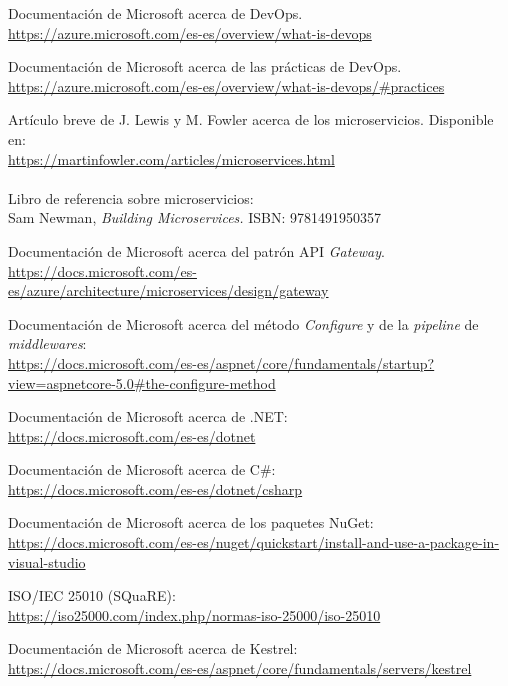 \documentclass[11pt,spanish,listoffigures]{tfgetsinf}
\begin{document}
\begin{thebibliography}{10}

Documentación de Microsoft acerca de DevOps.\\
\url{https://azure.microsoft.com/es-es/overview/what-is-devops}

Documentación de Microsoft acerca de las prácticas de DevOps.\\
\url{https://azure.microsoft.com/es-es/overview/what-is-devops/#practices}

Artículo breve de J. Lewis y M. Fowler acerca de los microservicios.
\newblock Disponible en:\\
\url{https://martinfowler.com/articles/microservices.html}\\\\
\newblock Libro de referencia sobre microservicios:\\
\newblock Sam Newman,
\newblock \emph{Building Microservices.}
\newblock ISBN: 9781491950357

Documentación de Microsoft acerca del patrón API \emph{Gateway}.\\
\url{https://docs.microsoft.com/es-es/azure/architecture/microservices/design/gateway}

Documentación de Microsoft acerca del método \emph{Configure} y de la \emph{pipeline} de \emph{middlewares}:\\
\url{https://docs.microsoft.com/es-es/aspnet/core/fundamentals/startup?view=aspnetcore-5.0#the-configure-method}

Documentación de Microsoft acerca de .NET:\\
\url{https://docs.microsoft.com/es-es/dotnet}

Documentación de Microsoft acerca de C\#:\\
\url{https://docs.microsoft.com/es-es/dotnet/csharp}

Documentación de Microsoft acerca de los paquetes NuGet:\\
\url{https://docs.microsoft.com/es-es/nuget/quickstart/install-and-use-a-package-in-visual-studio}

ISO/IEC 25010 (SQuaRE):\\
\url{https://iso25000.com/index.php/normas-iso-25000/iso-25010}

Documentación de Microsoft acerca de Kestrel:\\
\url{https://docs.microsoft.com/es-es/aspnet/core/fundamentals/servers/kestrel}

\end{thebibliography}
\end{document}
